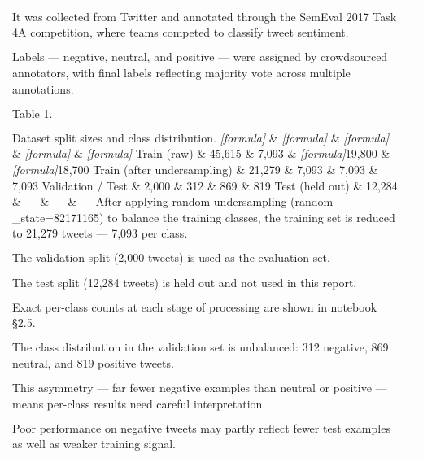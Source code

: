 \documentclass[11pt]{article}
\begin{document}
\begin{longtable}{|p{}|p{}|}
\hline
\rule{0pt}{3.5cm} & \\
\hline
It was collected from Twitter and annotated through the SemEval 2017 Task 4A competition, where teams competed to classify tweet sentiment. & \\[2pt]
\hline
\rule{0pt}{3.5cm} & \\
\hline
Labels --- negative, neutral, and positive --- were assigned by crowdsourced annotators, with final labels reflecting majority vote across multiple annotations. & \\[2pt]
\hline
\rule{0pt}{3.5cm} & \\
\hline
Table 1. & \\[2pt]
\hline
\rule{0pt}{3.5cm} & \\
\hline
Dataset split sizes and class distribution. \textit{[formula]} \& \textit{[formula]} \& \textit{[formula]} \& \textit{[formula]} \& \textit{[formula]} Train (raw) \& 45,615 \& 7,093 \& \textit{[formula]}19,800 \& \textit{[formula]}18,700 Train (after undersampling) \& 21,279 \& 7,093 \& 7,093 \& 7,093 Validation / Test \& 2,000 \& 312 \& 869 \& 819 Test (held out) \& 12,284 \& --- \& --- \& --- After applying random undersampling (random \_state=82171165) to balance the training classes, the training set is reduced to 21,279 tweets --- 7,093 per class. & \\[2pt]
\hline
\rule{0pt}{3.5cm} & \\
\hline
The validation split (2,000 tweets) is used as the evaluation set. & \\[2pt]
\hline
\rule{0pt}{3.5cm} & \\
\hline
The test split (12,284 tweets) is held out and not used in this report. & \\[2pt]
\hline
\rule{0pt}{3.5cm} & \\
\hline
Exact per-class counts at each stage of processing are shown in notebook §2.5. & \\[2pt]
\hline
\rule{0pt}{3.5cm} & \\
\hline
The class distribution in the validation set is unbalanced: 312 negative, 869 neutral, and 819 positive tweets. & \\[2pt]
\hline
\rule{0pt}{3.5cm} & \\
\hline
This asymmetry --- far fewer negative examples than neutral or positive --- means per-class results need careful interpretation. & \\[2pt]
\hline
\rule{0pt}{3.5cm} & \\
\hline
Poor performance on negative tweets may partly reflect fewer test examples as well as weaker training signal. & \\[2pt]

\end{longtable}
\end{document}
